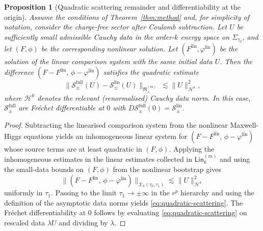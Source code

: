 \documentclass[11pt]{article}
\numberwithin{equation}{section}
\theoremstyle{plain}
\newtheorem{proposition}[theorem]{Proposition}
\theoremstyle{definition}
\theoremstyle{remark}
\newcommand{\Lin}{\mathsf{Lin}}
\begin{document}
\begin{proposition}[Quadratic scattering remainder and differentiability at the origin]\label{prop:quadratic-remainder}
Assume the conditions of Theorem~\ref{thm:method} and, for simplicity of notation, consider the charge-free sector after Coulomb subtraction.
Let $U$ be sufficiently small admissible Cauchy data in the order-$k$ energy space on $\Sigma_{\tau_{0}}$, and let $(F,\phi)$ be the corresponding nonlinear solution.
Let $(F^{\mathrm{lin}},\varphi^{\mathrm{lin}})$ be the solution of the linear comparison system with the \emph{same} initial data $U$.
Then the difference $(F-F^{\mathrm{lin}},\,\phi-\varphi^{\mathrm{lin}})$ satisfies the quadratic estimate
\begin{equation}\label{eq:quadratic-scattering}
\bigl\|\mathscr S_{\pm}^{\mathrm{full}}(U)-\mathscr S_{\pm}^{\mathrm{lin}}(U)\bigr\|_{\mathfrak R_{\pm}^{(m)}}
\ \lesssim
\|U\|_{\mathcal H^{k}}^{2},
\end{equation}
where $\mathcal H^{k}$ denotes the relevant (renormalised) Cauchy data norm.
In this case, $\mathscr S_{\pm}^{\mathrm{full}}$ are Fr\'echet differentiable at $0$ with
$D\mathscr S_{\pm}^{\mathrm{full}}(0)=\mathscr S_{\pm}^{\mathrm{lin}}$.
\end{proposition}

\begin{proof}
Subtracting the linearised comparison system from the nonlinear Maxwell-Higgs equations yields an inhomogeneous linear system for $(F-F^{\mathrm{lin}},\,\phi-\varphi^{\mathrm{lin}})$ whose source terms are at least quadratic in $(F,\phi)$.
Applying the inhomogeneous estimates in the linear estimates collected in $\Lin_{k}^{(m)}$ and using the small-data bounds on $(F,\phi)$ from the nonlinear bootstrap gives
\begin{equation}
\|(F-F^{\mathrm{lin}},\,\phi-\varphi^{\mathrm{lin}})\|_{\mathcal X_{k}(\tau_{0},\tau_{1})}
\lesssim
\|U\|_{\mathcal H^{k}}^{2}
\end{equation}
uniformly in $\tau_{1}$.
Passing to the limit $\tau_{1}\to\pm\infty$ in the $r^{p}$ hierarchy and using the definition of the asymptotic data norms yields \eqref{eq:quadratic-scattering}.
The Fr\'echet differentiability at $0$ follows by evaluating \eqref{eq:quadratic-scattering} on rescaled data $\lambda U$ and dividing by $\lambda$.
\end{proof}
\end{document}
